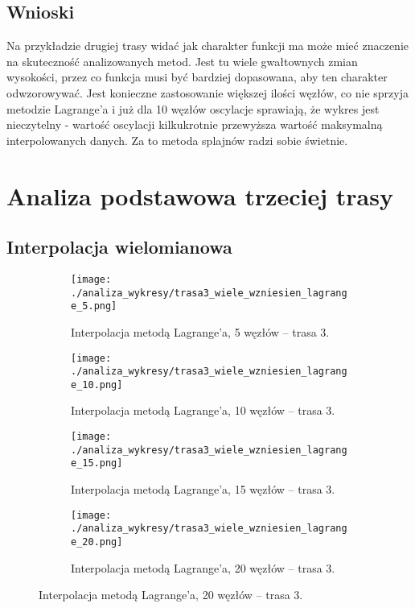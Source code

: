\documentclass[a4paper,12pt]{article}
\begin{document}
\subsection{Wnioski}
Na przykładzie drugiej trasy widać jak charakter funkcji ma może mieć znaczenie na skuteczność analizowanych metod. Jest tu wiele gwałtownych zmian wysokości, przez co funkcja musi być bardziej dopasowana, aby ten charakter odwzorowywać. Jest konieczne zastosowanie większej ilości węzłów, co nie sprzyja metodzie Lagrange'a i już dla 10 węzłów oscylacje sprawiają, że wykres jest nieczytelny - wartość oscylacji kilkukrotnie przewyższa wartość maksymalną interpolowanych danych. Za to metoda splajnów radzi sobie świetnie.


\section{Analiza podstawowa trzeciej trasy}
\subsection{Interpolacja wielomianowa}
\begin{figure}[H]
    \centering
    \begin{subfigure}{0.45\textwidth}
        \centering
        \texttt{[image: ./analiza\_wykresy/trasa3\_wiele\_wzniesien\_lagrange\_5.png]}
        \caption{Interpolacja metodą Lagrange’a, 5 węzłów – trasa 3.}
    \end{subfigure}\hfill
    \begin{subfigure}{0.45\textwidth}
        \centering
        \texttt{[image: ./analiza\_wykresy/trasa3\_wiele\_wzniesien\_lagrange\_10.png]}
        \caption{Interpolacja metodą Lagrange’a, 10 węzłów – trasa 3.}
    \end{subfigure}
    
    \vspace{0.5cm}
    
    \begin{subfigure}{0.45\textwidth}
        \centering
        \texttt{[image: ./analiza\_wykresy/trasa3\_wiele\_wzniesien\_lagrange\_15.png]}
        \caption{Interpolacja metodą Lagrange’a, 15 węzłów – trasa 3.}
    \end{subfigure}\hfill
    \begin{subfigure}{0.45\textwidth}
        \centering
        \texttt{[image: ./analiza\_wykresy/trasa3\_wiele\_wzniesien\_lagrange\_20.png]}
        \caption{Interpolacja metodą Lagrange’a, 20 węzłów – trasa 3.}
    \end{subfigure}
\end{figure}
\end{document}
